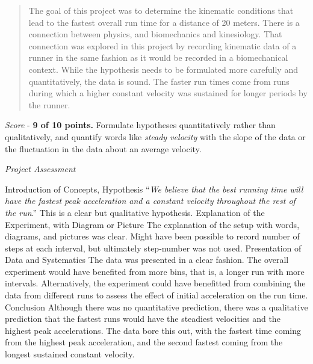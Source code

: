 \documentclass[10pt]{article}
\begin{document}
\maketitle

\begin{abstract}
The goal of this project was to determine the kinematic conditions that lead to the fastest overall run time for a distance of 20 meters.  There is a connection between physics, and biomechanics and kinesiology.  That connection was explored in this project by recording kinematic data of a runner in the same fashion as it would be recorded in a biomechanical context.  While the hypothesis needs to be formulated more carefully and quantitatively, the data is sound.  The faster run times come from runs during which a higher constant velocity was sustained for longer periods by the runner.
\end{abstract}

\textit{Score} - \textbf{9 of 10 points.}  Formulate hypotheses quantitatively rather than qualitatively, and quantify words like \textit{steady velocity} with the slope of the data or the fluctuation in the data about an average velocity.

\textit{Project Assessment}
\begin{outline}[enumerate]
\1 Introduction of Concepts, Hypothesis
\2 ``\textit{We believe that the best running time will have the fastest peak acceleration and a constant velocity throughout the rest of the run}.''  This is a clear but qualitative hypothesis.
\1 Explanation of the Experiment, with Diagram or Picture
\2 The explanation of the setup with words, diagrams, and pictures was clear.
\2 Might have been possible to record number of steps at each interval, but ultimately step-number was not used.
\1 Presentation of Data and Systematics
\2 The data was presented in a clear fashion.
\2 The overall experiment would have benefited from more bins, that is, a longer run with more intervals.  Alternatively, the experiment could have benefitted from combining the data from different runs to assess the effect of initial acceleration on the run time.
\1 Conclusion
\2 Although there was no quantitative prediction, there was a qualitative prediction that the fastest runs would have the steadiest velocities and the highest peak accelerations.  The data bore this out, with the fastest time coming from the highest peak acceleration, and the second fastest coming from the longest sustained constant velocity.
\end{outline}
\end{document}
